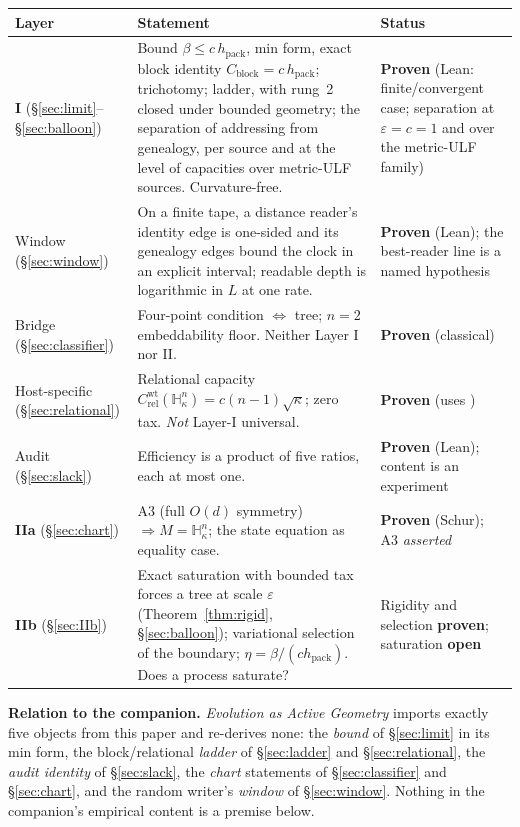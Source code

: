 \documentclass[11pt,reqno]{amsart}
\theoremstyle{plain}
\theoremstyle{definition}
\newcommand{\hpack}{h_{\mathrm{pack}}}
\newcommand{\Crel}{C_{\mathrm{rel}}}
\newcommand{\Cblock}{C_{\mathrm{block}}}
\newcommand{\Hk}{\mathbb{H}^n_\kappa}
\newcommand{\eps}{\varepsilon}
\begin{document}
\begin{center}\small
\begin{tabular}{@{}>{\raggedright\arraybackslash}p{2.1cm}>{\raggedright\arraybackslash}p{7.0cm}>{\raggedright\arraybackslash}p{3.6cm}@{}}
\toprule
\textbf{Layer} & \textbf{Statement} & \textbf{Status} \\
\midrule
\textbf{I} (\S\ref{sec:limit}--\S\ref{sec:balloon}) & Bound $\beta\le c\,\hpack$, min form, exact block identity $\Cblock=c\,\hpack$; trichotomy; ladder, with rung~2 closed under bounded geometry; the separation of addressing from genealogy, per source and at the level of capacities over metric-ULF sources. Curvature-free. & \textbf{Proven} (Lean: finite/convergent case; separation at $\eps=c=1$ and over the metric-ULF family) \\
Window (\S\ref{sec:window}) & On a finite tape, a distance reader's identity edge is one-sided and its genealogy edges bound the clock in an explicit interval; readable depth is logarithmic in $L$ at one rate. & \textbf{Proven} (Lean); the best-reader line is a named hypothesis \\
Bridge (\S\ref{sec:classifier}) & Four-point condition $\Leftrightarrow$ tree; $n=2$ embeddability floor. Neither Layer I nor II. & \textbf{Proven} (classical) \\
Host-specific (\S\ref{sec:relational}) & Relational capacity $\Crel^{\mathrm{wt}}(\Hk)=c(n-1)\sqrt\kappa$; zero tax. \emph{Not} Layer-I universal. & \textbf{Proven} (uses \cite{skenderi2026}) \\
Audit (\S\ref{sec:slack}) & Efficiency is a product of five ratios, each at most one. & \textbf{Proven} (Lean); content is an experiment \\
\textbf{IIa} (\S\ref{sec:chart}) & A3 (full $O(d)$ symmetry) $\Rightarrow M=\Hk$; the state equation as equality case. & \textbf{Proven} (Schur); A3 \emph{asserted} \\
\textbf{IIb} (\S\ref{sec:IIb}) & Exact saturation with bounded tax forces a tree at scale $\eps$ (Theorem~\ref{thm:rigid}, \S\ref{sec:balloon}); variational selection of the boundary; $\eta=\beta/(c\hpack)$. Does a process saturate? & Rigidity and selection \textbf{proven}; saturation \textbf{open} \\
\bottomrule
\end{tabular}
\end{center}

\medskip
\noindent\textbf{Relation to the companion.} \emph{Evolution as Active Geometry} imports exactly five objects from this paper and re-derives none: the \emph{bound} of \S\ref{sec:limit} in its min form, the block/relational \emph{ladder} of \S\ref{sec:ladder} and \S\ref{sec:relational}, the \emph{audit identity} of \S\ref{sec:slack}, the \emph{chart} statements of \S\ref{sec:classifier} and \S\ref{sec:chart}, and the random writer's \emph{window} of \S\ref{sec:window}. Nothing in the companion's empirical content is a premise below.
\end{document}
